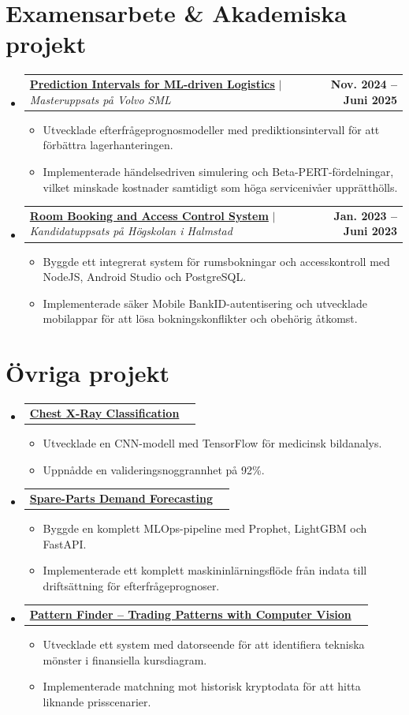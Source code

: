 \documentclass[10pt,a4paper]{article}
\makeatletter
\newcommand{\resumeItem}[1]{
  \item\small{
    {#1 \vspace{-2pt}}
  }
}
\newcommand{\resumeProjectHeading}[2]{
    \vspace{3pt}\item
    \begin{tabular*}{1.0\textwidth}{l@{\extracolsep{\fill}}r}
      \small#1 & \textbf{\small #2} \\
    \end{tabular*}\vspace{-3pt}
}
\newcommand{\resumeSubHeadingListStart}{\begin{itemize}[leftmargin=0.0in, label={}]}
\newcommand{\resumeSubHeadingListEnd}{\end{itemize}}
\newcommand{\resumeItemListStart}{\begin{itemize}[leftmargin=0.15in]}
\newcommand{\resumeItemListEnd}{\end{itemize}\vspace{1pt}}
\makeatother
\begin{document}
\section{Examensarbete \& Akademiska projekt}
    \resumeSubHeadingListStart
      \resumeProjectHeading
          {\href{https://urn.kb.se/resolve?urn=urn:nbn:se:hh:diva-57027}{\textbf{Prediction Intervals for ML-driven Logistics}} $|$ \emph{Masteruppsats på Volvo SML}}{Nov. 2024 -- Juni 2025}
          \resumeItemListStart
            \resumeItem{Utvecklade efterfrågeprognosmodeller med prediktionsintervall för att förbättra lagerhanteringen.}
            \resumeItem{Implementerade händelsedriven simulering och Beta-PERT-fördelningar, vilket minskade kostnader samtidigt som höga servicenivåer upprätthölls.}
          \resumeItemListEnd
      \resumeProjectHeading
          {\href{https://urn.kb.se/resolve?urn=urn:nbn:se:hh:diva-51061}{\textbf{Room Booking and Access Control System}} $|$ \emph{Kandidatuppsats på Högskolan i Halmstad}}{Jan. 2023 -- Juni 2023}
          \resumeItemListStart
            \resumeItem{Byggde ett integrerat system för rumsbokningar och accesskontroll med NodeJS, Android Studio och PostgreSQL.}
            \resumeItem{Implementerade säker Mobile BankID-autentisering och utvecklade mobilappar för att lösa bokningskonflikter och obehörig åtkomst.}
          \resumeItemListEnd
    \resumeSubHeadingListEnd

\section{Övriga projekt}
    \resumeSubHeadingListStart
      \resumeProjectHeading
          {\href{https://github.com/ham0di01/chest-xray-classification}{\textbf{Chest X-Ray Classification}}}{}
          \resumeItemListStart
            \resumeItem{Utvecklade en CNN-modell med TensorFlow för medicinsk bildanalys.}
            \resumeItem{Uppnådde en valideringsnoggrannhet på 92\%.}
          \resumeItemListEnd
      \resumeProjectHeading
          {\href{https://github.com/ham0di01/mlops-forecasting-service}{\textbf{Spare-Parts Demand Forecasting}}}{}
          \resumeItemListStart
            \resumeItem{Byggde en komplett MLOps-pipeline med Prophet, LightGBM och FastAPI.}
            \resumeItem{Implementerade ett komplett maskininlärningsflöde från indata till driftsättning för efterfrågeprognoser.}
          \resumeItemListEnd
      \resumeProjectHeading
          {\href{https://github.com/ham0di01/pattern-finder}{\textbf{Pattern Finder -- Trading Patterns with Computer Vision}}}{}
          \resumeItemListStart
            \resumeItem{Utvecklade ett system med datorseende för att identifiera tekniska mönster i finansiella kursdiagram.}
            \resumeItem{Implementerade matchning mot historisk kryptodata för att hitta liknande prisscenarier.}
          \resumeItemListEnd
    \resumeSubHeadingListEnd
\end{document}
